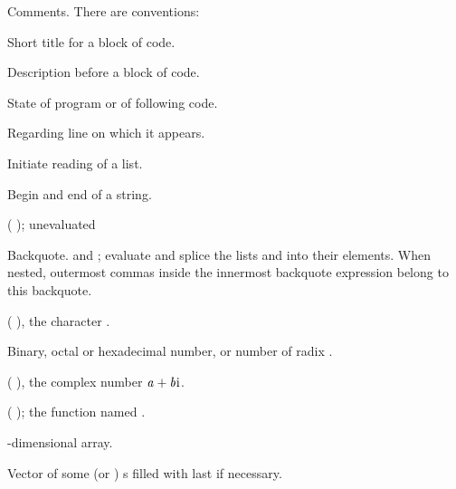\begin{LIST}{1cm}

  {
  Comments. There are conventions:
  }
  \begin{LIST}{.5cm}
    {Short title for a block of code.}

    {Description before a block of code.}

    {State of program or of following code.}

    {Regarding line on which it appears.}

  \end{LIST}

  \IT{\KWD*{(}}
  {
  Initiate reading of a list.
  }

  {
  Begin and end of a string.
  }

  {
  ( );  unevaluated
  }

  {
  Backquote.   and ; evaluate 
  and splice the lists  and  into their
  elements. When nested, outermost commas inside the innermost
  backquote expression belong to this backquote.
  }

  {
  ( ), the character .
  }

  {
  Binary, octal or hexadecimal number, or number of radix . 
  }

  {
    (  ), the complex number $\VAR{a}+\VAR{b}\text{i}$.
  }

  {
  ( ); the function named .
  }

  {
  -dimensional array.
  }

  {
  \index{\#(}%
  Vector of some (or )
  s filled with last  if necessary.
  }


\end{LIST}
